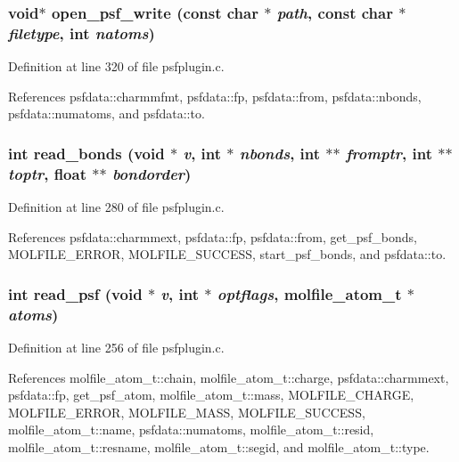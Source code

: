 \subsubsection{\setlength{\rightskip}{0pt plus 5cm}void$\ast$ open\_\-psf\_\-write (const char $\ast$ {\em path}, const char $\ast$ {\em filetype}, int {\em natoms})\hspace{0.3cm}{\tt  [static]}}\label{psfplugin_8c_a9}




Definition at line 320 of file psfplugin.c.

References psfdata::charmmfmt, psfdata::fp, psfdata::from, psfdata::nbonds, psfdata::numatoms, and psfdata::to.
\subsubsection{\setlength{\rightskip}{0pt plus 5cm}int read\_\-bonds (void $\ast$ {\em v}, int $\ast$ {\em nbonds}, int $\ast$$\ast$ {\em fromptr}, int $\ast$$\ast$ {\em toptr}, float $\ast$$\ast$ {\em bondorder})\hspace{0.3cm}{\tt  [static]}}\label{psfplugin_8c_a7}




Definition at line 280 of file psfplugin.c.

References psfdata::charmmext, psfdata::fp, psfdata::from, get\_\-psf\_\-bonds, MOLFILE\_\-ERROR, MOLFILE\_\-SUCCESS, start\_\-psf\_\-bonds, and psfdata::to.
\subsubsection{\setlength{\rightskip}{0pt plus 5cm}int read\_\-psf (void $\ast$ {\em v}, int $\ast$ {\em optflags}, {\bf molfile\_\-atom\_\-t} $\ast$ {\em atoms})\hspace{0.3cm}{\tt  [static]}}\label{psfplugin_8c_a6}




Definition at line 256 of file psfplugin.c.

References molfile\_\-atom\_\-t::chain, molfile\_\-atom\_\-t::charge, psfdata::charmmext, psfdata::fp, get\_\-psf\_\-atom, molfile\_\-atom\_\-t::mass, MOLFILE\_\-CHARGE, MOLFILE\_\-ERROR, MOLFILE\_\-MASS, MOLFILE\_\-SUCCESS, molfile\_\-atom\_\-t::name, psfdata::numatoms, molfile\_\-atom\_\-t::resid, molfile\_\-atom\_\-t::resname, molfile\_\-atom\_\-t::segid, and molfile\_\-atom\_\-t::type.
